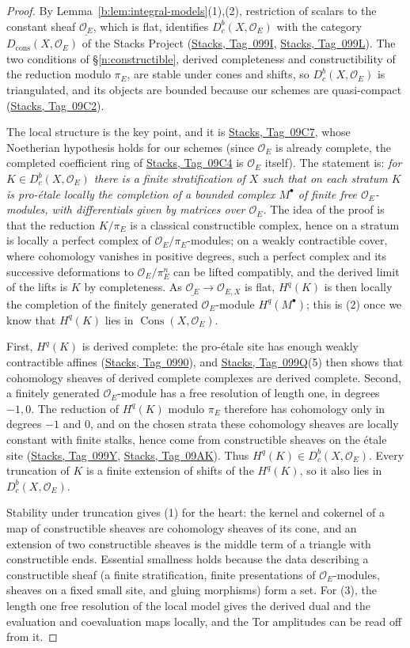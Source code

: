 \documentclass[11pt,a4paper]{article}
\numberwithin{equation}{section}
\theoremstyle{definition}
\theoremstyle{remark}
\newcommand{\Dbc}{D^b_c}
\newcommand{\stacks}[1]{\href{https://stacks.math.columbia.edu/tag/#1}{\textnormal{Stacks, Tag~#1}}}
\newcommand{\Dc}{D_{\mathrm{cons}}}
\newcommand{\Cons}{\operatorname{Cons}}
\begin{document}
\begin{proof}
By Lemma~\ref{b:lem:integral-models}(1),(2), restriction of scalars to
the constant sheaf $\underline{\mathcal O_E}$, which is flat, identifies
$\Dbc(X,\mathcal O_E)$ with the category $\Dc(X,\mathcal O_E)$ of the
Stacks Project (\stacks{099I}, \stacks{099L}). The two conditions of
\S\ref{n:constructible}, derived completeness and constructibility of the
reduction modulo $\pi_E$, are stable under cones and shifts, so
$\Dbc(X,\mathcal O_E)$ is triangulated, and its objects are bounded
because our schemes are quasi-compact (\stacks{09C2}).

The local structure is the key point, and it is \stacks{09C7}, whose
Noetherian hypothesis holds for our schemes (since $\mathcal O_E$ is
already complete, the completed coefficient ring of \stacks{09C4} is
$\mathcal O_E$ itself). The statement is: \emph{for
$K\in\Dbc(X,\mathcal O_E)$ there is a finite stratification of $X$ such
that on each stratum $K$ is pro-\'etale locally the completion of a
bounded complex $M^\bullet$ of finite free $\mathcal O_E$-modules, with
differentials given by matrices over $\mathcal O_E$.} The idea of the
proof is that the reduction $K/\pi_E$ is a classical constructible complex,
hence on a stratum is locally a perfect complex of
$\mathcal O_E/\pi_E$-modules; on a weakly contractible cover, where
cohomology vanishes in positive degrees, such a perfect complex and its
successive deformations to $\mathcal O_E/\pi_E^n$ can be lifted
compatibly, and the derived limit of the lifts is $K$ by completeness. As $\underline{\mathcal O_E}\to\mathcal O_{E,X}$ is flat,
$H^q(K)$ is then locally the completion of the finitely generated
$\mathcal O_E$-module $H^q(M^\bullet)$; this is (2) once we know that
$H^q(K)$ lies in $\Cons(X,\mathcal O_E)$.

First, $H^q(K)$ is derived complete: the
pro-\'etale site has enough weakly contractible affines
(\stacks{0990}), and \stacks{099Q}(5) then shows that cohomology sheaves
of derived complete complexes are derived complete. Second, a finitely
generated $\mathcal O_E$-module has a free resolution of length one, in
degrees $-1,0$. The reduction of $H^q(K)$ modulo $\pi_E$ therefore has
cohomology only in degrees $-1$ and $0$, and on the chosen strata these
cohomology sheaves are locally constant with finite stalks, hence come
from constructible sheaves on the \'etale site (\stacks{099Y},
\stacks{09AK}). Thus $H^q(K)\in\Dbc(X,\mathcal O_E)$. Every truncation
of $K$ is a finite extension of shifts of the $H^q(K)$, so it also lies
in $\Dbc(X,\mathcal O_E)$.

Stability under truncation gives (1) for the heart: the kernel and
cokernel of a map of constructible sheaves are cohomology sheaves of its
cone, and an extension of two constructible sheaves is the middle term
of a triangle with constructible ends. Essential smallness holds because
the data describing a constructible sheaf (a finite stratification,
finite presentations of $\mathcal O_E$-modules, sheaves on a fixed small
site, and gluing morphisms) form a set. For (3), the length one free
resolution of the local model gives the derived dual and the evaluation
and coevaluation maps locally, and the Tor amplitudes can be read off
from it.
\end{proof}
\end{document}
